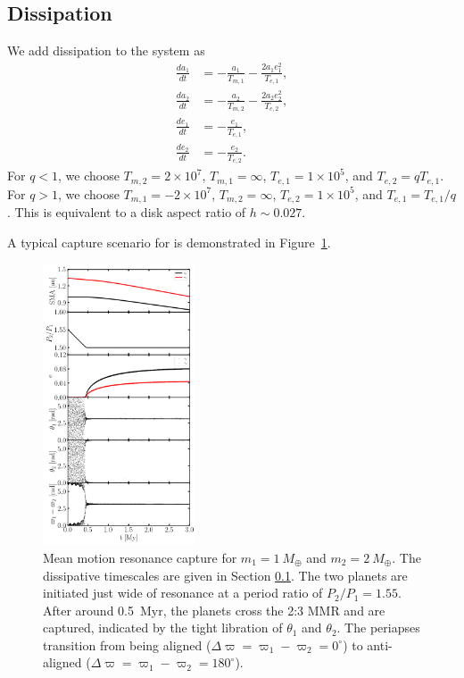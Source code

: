 \documentclass[usenatbib,twocolumn]{mnras}
\begin{document}
\subsection{Dissipation}\label{sec:cm-dis}
We add dissipation to the system as
\begin{align}
 \frac{da_1}{dt} &=- \frac{a_{1}}{T_{m,1}} - \frac{2 a_{1} e_{1}^{2}}{T_{e,1}},\\
 \frac{da_2}{dt} &=- \frac{a_{2}}{T_{m,2}} - \frac{2 a_{2} e_{2}^{2}}{T_{e,2}},\\
 \frac{de_1}{dt} &=- \frac{e_{1}}{T_{e,1}},\\
 \frac{de_2}{dt} &=- \frac{e_{2}}{T_{e,2}}.
\end{align}
For $q<1$, we choose $T_{m,2}=2\times10^7$, $T_{m,1}=\infty$, $T_{e,1}=1\times10^5$, and $T_{e,2}=qT_{e,1}$.
For $q>1$, we choose $T_{m,1}=-2\times10^7$, $T_{m,2}=\infty$, $T_{e,2}=1\times10^5$, and $T_{e,1}=T_{e,1}/q$.
This is equivalent to a disk aspect ratio of $h\sim 0.027$.

A typical capture scenario for is demonstrated in Figure~\ref{fig:cm-control}.

\begin{figure}
    \includegraphics[width=0.4\textwidth]{cm_0_0.png}
\caption{Mean motion resonance capture for $m_1=1~M_\oplus$ and $m_2=2~M_\oplus$. The dissipative timescales are given in Section \ref{sec:cm-dis}. The two planets are initiated just wide of resonance at a period ratio of $P_2/P_1=1.55$. After around 0.5~Myr, the planets cross the 2:3 MMR and are captured, indicated by the tight libration of $\theta_1$ and $\theta_2$. The periapses transition from being aligned ($\Delta\varpi=\varpi_1-\varpi_2=0^\circ$) to anti-aligned ($\Delta\varpi=\varpi_1-\varpi_2=180^\circ$).}
    \label{fig:cm-control}
\end{figure}
\end{document}
